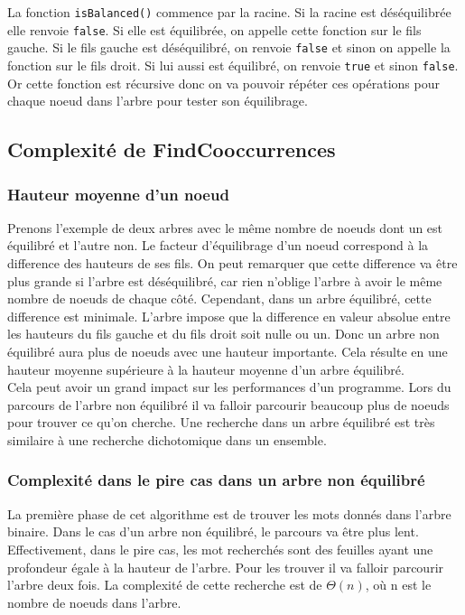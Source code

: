 \documentclass[11pt]{article}
\begin{document}
    La fonction \texttt{isBalanced()} commence par la racine. Si la racine est
    déséquilibrée elle renvoie \texttt{false}. Si elle est équilibrée, on
    appelle cette fonction sur le fils gauche. Si le fils gauche est déséquilibré, on
    renvoie \texttt{false} et sinon on appelle la fonction sur le fils droit.
    Si lui aussi est équilibré, on renvoie \texttt{true} et sinon \texttt{false}.
    Or cette fonction est récursive donc on va pouvoir répéter ces opérations pour
    chaque noeud dans l'arbre pour tester son équilibrage.

    \subsection{Complexité de FindCooccurrences}

        \subsubsection{Hauteur moyenne d'un noeud}
        Prenons l'exemple de deux arbres avec le même nombre de noeuds dont un
        est équilibré et l'autre non.
        Le facteur d'équilibrage d'un noeud correspond à la difference des
        hauteurs de ses fils. On peut remarquer que cette difference va être plus
        grande si l'arbre est déséquilibré, car rien n'oblige l'arbre à avoir
        le même nombre de noeuds de chaque côté. Cependant, dans un arbre
        équilibré, cette difference est minimale. L'arbre impose que la difference
        en valeur absolue entre les hauteurs du fils gauche et du fils droit soit
        nulle ou un. Donc un arbre non équilibré aura plus de noeuds avec une
        hauteur importante. Cela résulte en une hauteur moyenne
        supérieure à la hauteur moyenne d'un arbre équilibré.\\

        Cela peut avoir un grand impact sur les performances d'un programme.
        Lors du parcours de l'arbre non équilibré il va falloir parcourir beaucoup
        plus de noeuds pour trouver ce qu'on cherche. Une recherche dans un arbre
        équilibré est très similaire à une recherche dichotomique dans un ensemble.


        \subsubsection{Complexité dans le pire cas dans un arbre non équilibré}
        La première phase de cet algorithme est de trouver les mots donnés dans
        l'arbre binaire. Dans le cas d'un arbre non équilibré, le parcours va être
        plus lent. Effectivement, dans le pire cas, les mot recherchés sont des
        feuilles ayant une profondeur égale à la hauteur de l'arbre. Pour les
        trouver il va falloir parcourir l'arbre deux fois. La complexité de
        cette recherche est de $\Theta(n)$, où n est le nombre de noeuds dans
        l'arbre.\\
\end{document}
